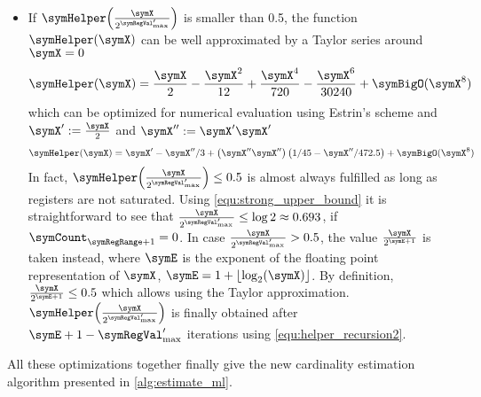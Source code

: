 \documentclass[a4paper]{scrartcl}
\begin{document}
\begin{itemize}
\item If $\symHelper\!\left(\frac{\symX}{2^{\symRegVal'_\text{max}}}\right)$ is smaller than 0.5, the function $\symHelper(\symX)$ can be well approximated by a Taylor series around $\symX=0$
\begin{equation}
\symHelper(\symX)
=
\frac{\symX}{2} - \frac{\symX^2}{12} +\frac{\symX^4}{720}-\frac{\symX^6}{30240} + \symBigO(\symX^{8})
\end{equation}
which can be optimized for numerical evaluation using Estrin's scheme and $\symX' := \frac{\symX}{2}$ and $\symX'' := \symX' \symX'$
\begin{equation}
\label{equ:taylor}
\symHelper(\symX)
=
\symX' - \symX''/3 + \left(\symX'' \symX''\right)\left(1/45-\symX''/472.5\right)
+ \symBigO(\symX^{8})
\end{equation}
In fact, $\symHelper\!\left(\frac{\symX}{2^{\symRegVal'_\text{max}}}\right)\leq 0.5$ is almost always fulfilled as long as registers are not saturated. Using \eqref{equ:strong_upper_bound} it is straightforward to see that $\frac{\symX}{2^{\symRegVal'_\text{max}}} \leq \log 2 \approx 0.693$, if $\symCount_{\symRegRange+1}=0$.
In case $\frac{\symX}{2^{\symRegVal'_\text{max}}} > 0.5$, the value $\frac{\symX}{2^{\symE+1}}$ is taken instead, where $\symE$ is the exponent of the floating point representation of $\symX$, $\symE = 1+\lfloor\log_2(\symX)\rfloor$. By definition, $\frac{\symX}{2^{\symE+1}}\leq 0.5$ which allows using the Taylor approximation. $\symHelper\!\left(\frac{\symX}{2^{\symRegVal'_\text{max}}}\right)$ is finally obtained after $\symE + 1 -\symRegVal'_\text{max}$ iterations using \eqref{equ:helper_recursion2}.
\end{itemize}

All these optimizations together finally give the new cardinality estimation algorithm presented in \cref{alg:estimate_ml}.
\end{document}
